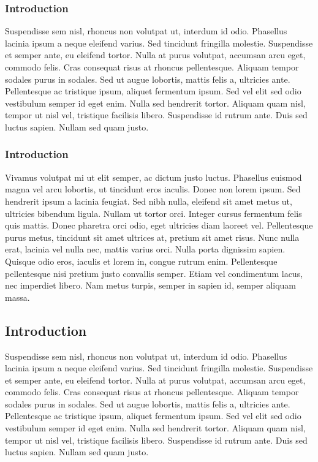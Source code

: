\subsubsection{Introduction}
Suspendisse sem nisl, rhoncus non volutpat ut, interdum id odio. Phasellus
lacinia ipsum a neque eleifend varius. Sed tincidunt fringilla molestie.
Suspendisse et semper ante, eu eleifend tortor. Nulla at purus volutpat,
accumsan arcu eget, commodo felis. Cras consequat risus at rhoncus
pellentesque. Aliquam tempor sodales purus in sodales. Sed ut augue lobortis,
mattis felis a, ultricies ante. Pellentesque ac tristique ipsum, aliquet
fermentum ipsum. Sed vel elit sed odio vestibulum semper id eget enim. Nulla
sed hendrerit tortor. Aliquam quam nisl, tempor ut nisl vel, tristique
facilisis libero. Suspendisse id rutrum ante. Duis sed luctus sapien. Nullam
sed quam justo.

\subsubsection{Introduction}
Vivamus volutpat mi ut elit semper, ac dictum justo luctus. Phasellus euismod
magna vel arcu lobortis, ut tincidunt eros iaculis. Donec non lorem ipsum. Sed
hendrerit ipsum a lacinia feugiat. Sed nibh nulla, eleifend sit amet metus ut,
ultricies bibendum ligula. Nullam ut tortor orci. Integer cursus fermentum
felis quis mattis. Donec pharetra orci odio, eget ultricies diam laoreet vel.
Pellentesque purus metus, tincidunt sit amet ultrices at, pretium sit amet
risus. Nunc nulla erat, lacinia vel nulla nec, mattis varius orci. Nulla porta
dignissim sapien. Quisque odio eros, iaculis et lorem in, congue rutrum enim.
Pellentesque pellentesque nisi pretium justo convallis semper. Etiam vel
condimentum lacus, nec imperdiet libero. Nam metus turpis, semper in sapien id,
semper aliquam massa.

\subsection{Introduction}
Suspendisse sem nisl, rhoncus non volutpat ut, interdum id odio. Phasellus
lacinia ipsum a neque eleifend varius. Sed tincidunt fringilla molestie.
Suspendisse et semper ante, eu eleifend tortor. Nulla at purus volutpat,
accumsan arcu eget, commodo felis. Cras consequat risus at rhoncus
pellentesque. Aliquam tempor sodales purus in sodales. Sed ut augue lobortis,
mattis felis a, ultricies ante. Pellentesque ac tristique ipsum, aliquet
fermentum ipsum. Sed vel elit sed odio vestibulum semper id eget enim. Nulla
sed hendrerit tortor. Aliquam quam nisl, tempor ut nisl vel, tristique
facilisis libero. Suspendisse id rutrum ante. Duis sed luctus sapien. Nullam
sed quam justo.

